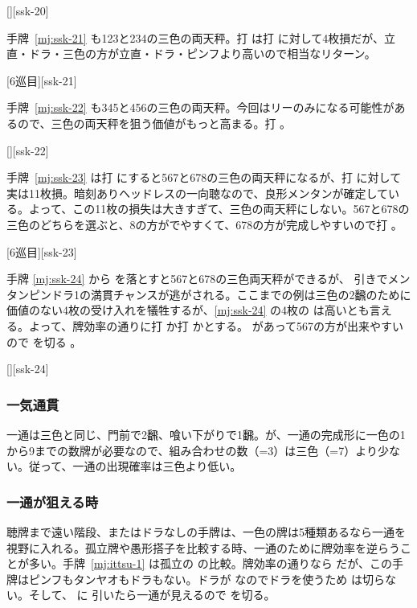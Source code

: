 \documentclass[../nankiru_main.tex]{subfiles}
\begin{document}
[][ssk-20]

手牌~\ref{mj:ssk-21} も123と234の三色の両天秤。打  は打  に対して4枚損だが、立直・ドラ・三色の方が立直・ドラ・ピンフより高いので相当なリターン\citep{clearrain-ssk}。

[6巡目][ssk-21]

手牌~\ref{mj:ssk-22} も345と456の三色の両天秤。今回はリーのみになる可能性があるので、三色の両天秤を狙う価値がもっと高まる\citep{gendai-ssk}。打 。

[][ssk-22]

手牌~\ref{mj:ssk-23} は打  にすると567と678の三色の両天秤になるが、打  に対して実は11枚損。暗刻ありヘッドレスの一向聴なので、良形メンタンが確定している。よって、この11枚の損失は大きすぎて、三色の両天秤にしない。567と678の三色のどちらを選ぶと、8の方がでやすくて、678の方が完成しやすいので打  \citep{clearrain-ssk}。

[6巡目][ssk-23]

手牌 \ref{mj:ssk-24} から  を落とすと567と678の三色両天秤ができるが、 引きでメンタンピンドラ1の満貫チャンスが逃がされる。ここまでの例は三色の2飜のために価値のない4枚の受け入れを犠牲するが、\ref{mj:ssk-24} の4枚の  は高いとも言える。よって、牌効率の通りに打  か打  かとする。 があって567の方が出来やすいので  を切る \citep{gendai-ssk}。

[][ssk-24]


\subsubsection{一気通貫}

一通は三色と同じ、門前で2飜、喰い下がりで1飜。が、一通の完成形に一色の1から9までの数牌が必要なので、組み合わせの数（=3）は三色（=7）より少ない。従って、一通の出現確率は三色より低い。


\subsubsection*{一通が狙える時}

聴牌まで遠い階段、またはドラなしの手牌は、一色の牌は5種類あるなら一通を視野に入れる。孤立牌や愚形搭子を比較する時、一通のために牌効率を逆らうことが多い。手牌~\ref{mj:ittsu-1} は孤立の  の比較。牌効率の通りなら  だが、この手牌はピンフもタンヤオもドラもない。ドラが  なのでドラを使うため  は切らない。そして、 に  引いたら一通が見えるので  を切る\citep[][p.~68]{zero-teyaku}。
\end{document}
